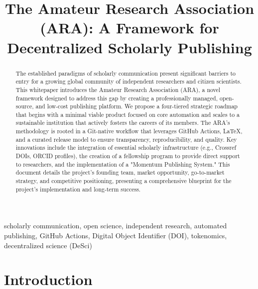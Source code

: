\documentclass[conference, compsoc, 11pt]{IEEEtran}
\title{The Amateur Research Association (ARA): A Framework for Decentralized Scholarly Publishing}
\author{
    \IEEEauthorblockN{Ivan Anishchuk}
    \IEEEauthorblockA{
        ivan@ivananishchuk.net https://ivananishchuk.work \\
	ORCID \orcidicon{0009-0008-8729-6137}: 0009-0008-8729-6137 %
    }
}
\begin{document}
\IEEEoverridecommandlockouts
{}

\maketitle

\IEEEpubidadjcol

\begin{abstract}
The established paradigms of scholarly communication present significant barriers to entry for a growing global community of independent researchers and citizen scientists. This whitepaper introduces the Amateur Research Association (ARA), a novel framework designed to address this gap by creating a professionally managed, open-source, and low-cost publishing platform. We propose a four-tiered strategic roadmap that begins with a minimal viable product focused on core automation and scales to a sustainable institution that actively fosters the careers of its members. The ARA’s methodology is rooted in a Git-native workflow that leverages GitHub Actions, LaTeX, and a curated release model to ensure transparency, reproducibility, and quality. Key innovations include the integration of essential scholarly infrastructure (e.g., Crossref DOIs, ORCID profiles), the creation of a fellowship program to provide direct support to researchers, and the implementation of a "Momentum Publishing System." This document details the project's founding team, market opportunity, go-to-market strategy, and competitive positioning, presenting a comprehensive blueprint for the project's implementation and long-term success.
\end{abstract}

\begin{IEEEkeywords}
scholarly communication, open science, independent research, automated publishing, GitHub Actions, Digital Object Identifier (DOI), tokenomics, decentralized science (DeSci)
\end{IEEEkeywords}


\section{Introduction}
\end{document}
